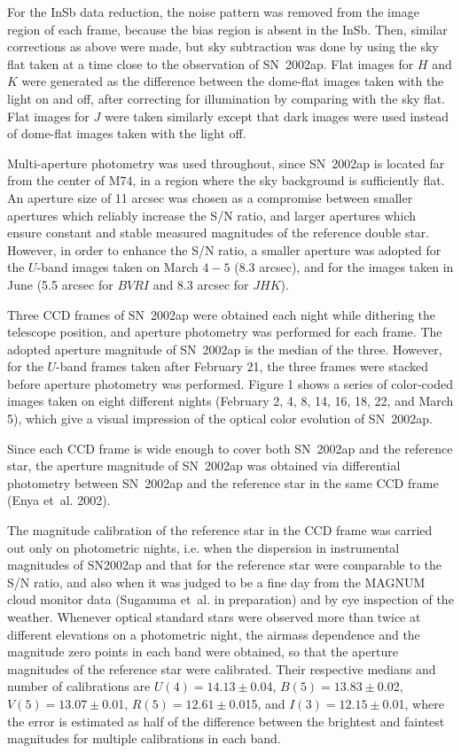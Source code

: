 \documentclass[10pt,preprint2]{aastex}
\begin{document}
For the InSb data reduction, the noise pattern was removed from
the image region of each frame, because the bias region is absent
in the InSb. Then, similar corrections as above were made, but sky
subtraction was done by using the sky flat taken at a time close to
the observation of SN~2002ap.   Flat images for $H$ and $K$ were
generated as the difference between the dome-flat images taken with
the light on and off, after correcting for illumination by comparing
with the sky flat.  Flat images for $J$ were taken similarly except
that dark images were used instead of dome-flat images taken with the
light off.

Multi-aperture photometry was used throughout, since SN~2002ap is
located far from the center of M74, in a region where the sky
background is sufficiently flat.  An aperture size of 11 arcsec
was chosen as a compromise between smaller apertures which
reliably increase the S/N ratio, and larger apertures which ensure
constant and stable measured magnitudes of the reference double
star. However, in order to enhance the S/N ratio, a smaller
aperture was adopted for the $U$-band images taken on March $4-5$
(8.3 arcsec), and for the images taken in June (5.5 arcsec for
$BVRI$ and 8.3 arcsec for $JHK$).

Three CCD frames of SN~2002ap were obtained each night while
dithering the telescope position, and aperture photometry
was performed for each frame. The adopted aperture magnitude
of SN~2002ap is the median of the three.  However, for the $U$-band frames
taken after February 21, the three frames were stacked before aperture
photometry was performed.
Figure 1 shows a series of color-coded images taken on eight
different nights (February 2, 4, 8, 14, 16, 18, 22, and March 5),
which give a visual impression of the optical color evolution
of SN~2002ap.

Since each CCD frame is wide enough to cover both SN~2002ap
and the reference star, the aperture magnitude of SN~2002ap was
obtained via differential photometry between SN~2002ap and
the reference star in the same CCD frame (Enya et~al. 2002).

The magnitude calibration of the reference star in the CCD frame
was carried out only on photometric nights, i.e. when the
dispersion in instrumental magnitudes of SN2002ap and that for the
reference star were comparable to the S/N ratio, and also when it
was judged to be a fine day from the MAGNUM cloud monitor data
(Suganuma et~al. in preparation) and by eye inspection of the
weather.  Whenever optical standard stars were observed more than
twice at different elevations on a photometric night, the airmass
dependence and the magnitude zero points in each band were
obtained, so that the aperture magnitudes of the reference star
were calibrated. Their respective medians and number of
calibrations are $U(4)=14.13\pm$0.04, $B(5)=13.83\pm$0.02,
$V(5)=13.07\pm$0.01, $R(5)=12.61\pm$0.015, and
$I(3)=12.15\pm$0.01, where the error is estimated as half of the
difference between the brightest and faintest magnitudes for
multiple calibrations in each band.
\end{document}
